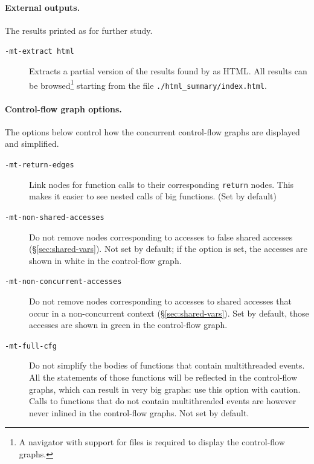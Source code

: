 \documentclass{frama-c-book}
\newcommand{\html}{\lang{HTML}}
\def\mysec#1{\S{\ref{sec:#1}}}
\begin{document}
\paragraph{External outputs.}
The \mthread results printed as \html for further study.
\begin{description}
\item[{\tt -mt-extract html}] Extracts a partial version of the
  results found by \mthread as HTML.  All results can be
  browsed\footnote{A navigator with support for  files
    is required to display the control-flow graphs.}
  starting from the file \verb+./html_summary/index.html+.
\end{description}

\paragraph{Control-flow graph options.}

The options below control how the concurrent control-flow graphs are displayed
and simplified.
\begin{description}

\item[{\tt -mt-return-edges}] Link nodes for function calls to
  their corresponding {\tt return} nodes. This makes it easier
  to see nested calls of big functions. (Set by default)

\item[{\tt -mt-non-shared-accesses}] Do not remove nodes corresponding
  to accesses to false shared accesses (\mysec{shared-vars}). Not set
  by default; if the option is set, the accesses are shown in white
  in the control-flow graph.

\item[{\tt -mt-non-concurrent-accesses}] Do not remove nodes corresponding
  to accesses to shared accesses that occur in a non-concurrent context
  (\mysec{shared-vars}). Set by default, those accesses are shown in
  green in the control-flow graph.

\item[{\tt -mt-full-cfg}] Do not simplify the bodies of functions that
  contain multithreaded events. All the statements of those functions
  will be reflected in the control-flow graphs, which can result in very
  big graphs:
  use this option with caution. Calls to functions that do not contain
  multithreaded events are however never inlined in the control-flow graphs.
  Not set by default.


\end{description}
\end{document}
